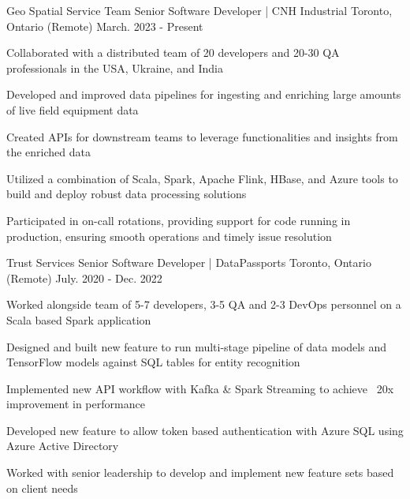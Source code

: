 \begin{cventries}


\cventry
    {Geo Spatial Service Team}
    {Senior Software Developer | CNH Industrial}
    {Toronto, Ontario (Remote)}
    {March. 2023 - Present}
    {
      \begin{cvitems}
 	 \item {Collaborated with a distributed team of 20 developers and 20-30 QA professionals in the USA, Ukraine, and India}
 	 \item {Developed and improved data pipelines for ingesting and enriching large amounts of live field equipment data}
  	\item {Created  APIs for downstream teams to leverage functionalities and insights from the enriched data}
        \item {Utilized a combination of Scala, Spark, Apache Flink, HBase, and Azure tools to build and deploy robust data processing solutions}
  	\item {Participated in on-call rotations, providing support for code running in production, ensuring smooth operations and timely issue resolution}
      \end{cvitems}
    }


\cventry
    {Trust Services}
    {Senior Software Developer | DataPassports}
    {Toronto, Ontario (Remote)}
    {July. 2020 - Dec. 2022}
    {
      \begin{cvitems}
	\item {Worked alongside team of 5-7 developers, 3-5 QA and 2-3 DevOps personnel on a Scala based Spark application}
        \item {Designed and built new feature to run multi-stage pipeline of data models and TensorFlow models against SQL tables for entity recognition}
	\item {Implemented new API workflow with Kafka \& Spark Streaming to achieve ~20x improvement in performance}
        \item {Developed new feature to allow token based authentication with Azure SQL using Azure Active Directory}
        \item {Worked with senior leadership to develop and implement new feature sets based on client needs}
      \end{cvitems}
    }


\end{cventries}
